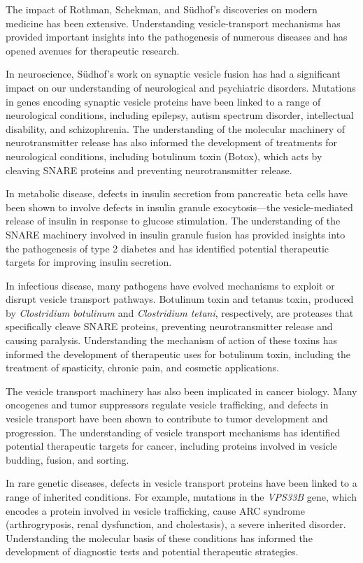 The impact of Rothman, Schekman, and S\"udhof's discoveries on modern medicine has been extensive. Understanding vesicle-transport mechanisms has provided important insights into the pathogenesis of numerous diseases and has opened avenues for therapeutic research.

In neuroscience, S\"udhof's work on synaptic vesicle fusion has had a significant impact on our understanding of neurological and psychiatric disorders. Mutations in genes encoding synaptic vesicle proteins have been linked to a range of neurological conditions, including epilepsy, autism spectrum disorder, intellectual disability, and schizophrenia. The understanding of the molecular machinery of neurotransmitter release has also informed the development of treatments for neurological conditions, including botulinum toxin (Botox), which acts by cleaving SNARE proteins and preventing neurotransmitter release.

In metabolic disease, defects in insulin secretion from pancreatic beta cells have been shown to involve defects in insulin granule exocytosis---the vesicle-mediated release of insulin in response to glucose stimulation. The understanding of the SNARE machinery involved in insulin granule fusion has provided insights into the pathogenesis of type 2 diabetes and has identified potential therapeutic targets for improving insulin secretion.

In infectious disease, many pathogens have evolved mechanisms to exploit or disrupt vesicle transport pathways. Botulinum toxin and tetanus toxin, produced by \textit{Clostridium botulinum} and \textit{Clostridium tetani}, respectively, are proteases that specifically cleave SNARE proteins, preventing neurotransmitter release and causing paralysis. Understanding the mechanism of action of these toxins has informed the development of therapeutic uses for botulinum toxin, including the treatment of spasticity, chronic pain, and cosmetic applications.

The vesicle transport machinery has also been implicated in cancer biology. Many oncogenes and tumor suppressors regulate vesicle trafficking, and defects in vesicle transport have been shown to contribute to tumor development and progression. The understanding of vesicle transport mechanisms has identified potential therapeutic targets for cancer, including proteins involved in vesicle budding, fusion, and sorting.

In rare genetic diseases, defects in vesicle transport proteins have been linked to a range of inherited conditions. For example, mutations in the \textit{VPS33B} gene, which encodes a protein involved in vesicle trafficking, cause ARC syndrome (arthrogryposis, renal dysfunction, and cholestasis), a severe inherited disorder. Understanding the molecular basis of these conditions has informed the development of diagnostic tests and potential therapeutic strategies.


